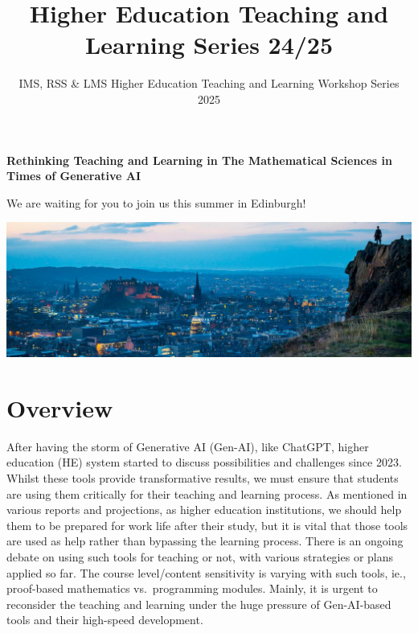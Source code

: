 \documentclass[
  letterpaper,
  DIV=11,
  numbers=noendperiod]{scrartcl}
\title{Higher Education Teaching and Learning Series 24/25}
\subtitle{IMS, RSS \& LMS Higher Education Teaching and Learning
Workshop Series 2025}
\author{}
\date{}
\renewcommand*\contentsname{Table of contents}
\newcommand\contentsname{Table of contents}
\begin{document}
\maketitle
\ifdefined\Shaded\renewenvironment{Shaded}{\begin{tcolorbox}[frame hidden, boxrule=0pt, sharp corners, borderline west={3pt}{0pt}{shadecolor}, enhanced, interior hidden, breakable]}{\end{tcolorbox}}\fi

\renewcommand*\contentsname{Table of contents}
{
\hypersetup{linkcolor=}
\setcounter{tocdepth}{3}
\tableofcontents
}
\textbf{Rethinking Teaching and Learning in The Mathematical Sciences in
Times of Generative AI}

We are waiting for you to join us this summer in Edinburgh!

\includegraphics[width=1\textwidth,height=\textheight]{./images/edi.jpg}\\

\hypertarget{overview}{%
\section{Overview}\label{overview}}

After having the storm of Generative AI (Gen-AI), like ChatGPT, higher
education (HE) system started to discuss possibilities and challenges
since 2023. Whilst these tools provide transformative results, we must
ensure that students are using them critically for their teaching and
learning process. As mentioned in various reports and projections, as
higher education institutions, we should help them to be prepared for
work life after their study, but it is vital that those tools are used
as help rather than bypassing the learning process. There is an ongoing
debate on using such tools for teaching or not, with various strategies
or plans applied so far. The course level/content sensitivity is varying
with such tools, ie., proof-based mathematics vs.~programming modules.
Mainly, it is urgent to reconsider the teaching and learning under the
huge pressure of Gen-AI-based tools and their high-speed development.
\end{document}
